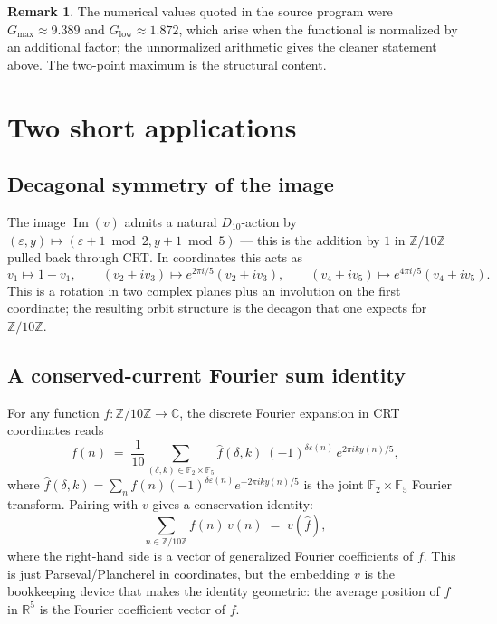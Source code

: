 \documentclass[11pt,reqno]{amsart}
\theoremstyle{definition}
\newtheorem{remark}[theorem]{Remark}
\newcommand{\Z}{\mathbb{Z}}
\newcommand{\R}{\mathbb{R}}
\newcommand{\C}{\mathbb{C}}
\newcommand{\F}{\mathbb{F}}
\DeclareMathOperator{\Img}{Im}
\begin{document}
\begin{remark}
The numerical values quoted in the source program were
$G_{\max} \approx 9.389$ and $G_{\mathrm{low}} \approx 1.872$,
which arise when the functional is normalized by an additional
factor; the unnormalized arithmetic gives the cleaner statement
above. The two-point maximum is the structural content.
\end{remark}

\section{Two short applications}
\label{sec:applications}

\subsection{Decagonal symmetry of the image}

The image $\Img(v)$ admits a natural $D_{10}$-action by
$(\varepsilon, y) \mapsto (\varepsilon + 1 \bmod 2,
y + 1 \bmod 5)$ — this is the addition by $1$ in
$\Z/10\Z$ pulled back through CRT. In coordinates this acts as
\[
  v_1 \mapsto 1 - v_1,
  \qquad
  (v_2 + i v_3) \mapsto e^{2\pi i / 5}(v_2 + i v_3),
  \qquad
  (v_4 + i v_5) \mapsto e^{4\pi i / 5}(v_4 + i v_5).
\]
This is a rotation in two complex planes plus an involution on the
first coordinate; the resulting orbit structure is the decagon
that one expects for $\Z/10\Z$.

\subsection{A conserved-current Fourier sum identity}

For any function $f : \Z/10\Z \to \C$, the discrete Fourier
expansion in CRT coordinates reads
\[
  f(n) \;=\; \frac{1}{10} \sum_{(\delta, k) \in \F_2 \times \F_5}
  \widehat{f}(\delta, k)\;
  (-1)^{\delta \varepsilon(n)} \, e^{2\pi i k y(n) / 5},
\]
where $\widehat{f}(\delta, k) = \sum_n f(n) (-1)^{\delta
\varepsilon(n)} e^{-2\pi i k y(n) / 5}$ is the joint
$\F_2 \times \F_5$ Fourier transform. Pairing with $v$ gives a
conservation identity:
\[
  \sum_{n \in \Z/10\Z} f(n) \, v(n) \;=\; v(\widehat{f}),
\]
where the right-hand side is a vector of generalized Fourier
coefficients of $f$. This is just Parseval/Plancherel in
coordinates, but the embedding $v$ is the bookkeeping device that
makes the identity geometric: the average position of $f$ in
$\R^5$ is the Fourier coefficient vector of $f$.
\end{document}
